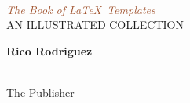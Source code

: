 \begin{titlepage} %

	\centering %
	
	
	\setlength{\unitlength}{0.6\textwidth} %
	
	{\color{LightGoldenrod}}\\[\baselineskip] %
	
	\textcolor{Sienna}{\textit{\Huge The Book of \LaTeX ~Templates}}\\[\baselineskip] %
	
	{\color{RosyBrown}\Large AN ILLUSTRATED COLLECTION}\\ %
	
	{\color{LightGoldenrod}} %
	
	\vfill %
	
	
	{\Large\textbf{Rico Rodriguez}}\\ %
	
	\vfill %
	
	
	\plogo\\[0.5\baselineskip] %
	
	The Publisher %

\end{titlepage}



